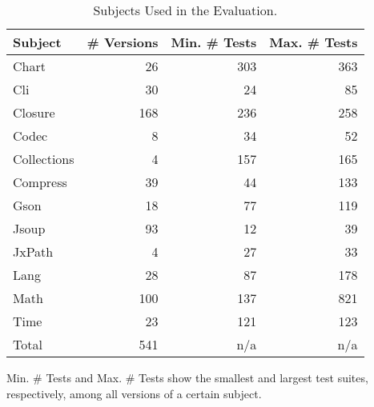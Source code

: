 \begin{table}[!t]
  \label{tab:projects}
  \centering
  \begin{tabular}{lrrr}
    \toprule
    Subject & \# Versions & Min. \# Tests & Max. \# Tests \\
    \midrule
    Chart & 26 & 303 & 363 \\
    Cli & 30 & 24 & 85 \\
    Closure & 168 & 236 & 258 \\
    Codec & 8 & 34 & 52 \\
    Collections & 4 & 157 & 165 \\
    Compress & 39 & 44 & 133 \\
    Gson & 18 & 77 & 119 \\
    Jsoup & 93 & 12 & 39 \\
    JxPath & 4 & 27 & 33 \\
    Lang & 28 & 87 & 178 \\
    Math & 100 & 137 & 821 \\
    Time & 23 & 121 & 123 \\
    \midrule
    Total & 541 & n/a & n/a\\
    \bottomrule
  \end{tabular}
  \begin{flushleft}
  \footnotesize
  Min. \# Tests and Max. \# Tests show the smallest and largest test suites, respectively, among all versions of a certain subject.
  \end{flushleft}
  \caption{Subjects Used in the Evaluation.}
\end{table}

%
